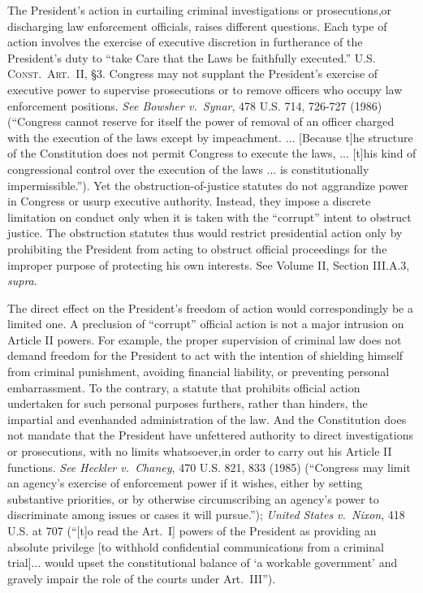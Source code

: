 The President’s action in curtailing criminal investigations or prosecutions,or discharging law enforcement officials, raises different questions.
Each type of action involves the exercise of executive discretion in furtherance of the President’s duty to “take Care that the Laws be faithfully executed.”
\textsc{U.S. Const.\ Art.~II}, \S 3.
Congress may not supplant the President’s exercise of executive power to supervise prosecutions or to remove officers who occupy law enforcement positions.
\textit{See Bowsher v.\ Synar}, 478 U.S. 714, 726-727 (1986) (“Congress cannot reserve for itself the power of removal of an officer charged with the execution of the laws except by impeachment. ... [Because t]he structure of the Constitution does not permit Congress to execute the laws, ... [t]his kind of congressional control over the execution of the laws ... is constitutionally impermissible.”).
Yet the obstruction-of-justice statutes do not aggrandize power in Congress or usurp executive authority.
Instead, they impose a discrete limitation on conduct only when it is taken with the “corrupt” intent to obstruct justice.
The obstruction statutes thus would restrict presidential action only by prohibiting the President from acting to obstruct official proceedings for the improper purpose of protecting his own interests.
See Volume II, Section III.A.3, \textit{supra}.

The direct effect on the President’s freedom of action would correspondingly be a limited one.
A preclusion of “corrupt” official action is not a major intrusion on Article II powers.
For example, the proper supervision of criminal law does not demand freedom for the President to act with the intention of shielding himself from criminal punishment, avoiding financial liability, or preventing personal embarrassment.
To the contrary, a statute that prohibits official action undertaken for such personal purposes furthers, rather than hinders, the impartial and evenhanded administration of the law.
And the Constitution does not mandate that the President have unfettered authority to direct investigations or prosecutions, with no limits whatsoever,in order to carry out his Article II functions.
\textit{See Heckler v.\ Chaney}, 470 U.S. 821, 833 (1985) (“Congress may limit an agency’s exercise of enforcement power if it wishes, either by setting substantive priorities, or by otherwise circumscribing an agency’s power to discriminate among issues or cases it will pursue.”);
\textit{United States v.\ Nixon}, 418 U.S. at 707 (“[t]o read the Art.~I] powers of the President as providing an absolute privilege [to withhold confidential communications from a criminal trial]... would upset the constitutional balance of ‘a workable government’ and gravely impair the role of the courts under Art.~III”).

